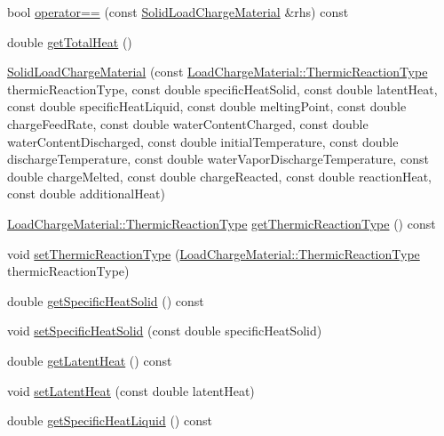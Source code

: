 \begin{DoxyCompactItemize}
\item 
bool \hyperlink{class_solid_load_charge_material_aacf2f41ce38067a52fb7d8456a05a699}{operator==} (const \hyperlink{class_solid_load_charge_material}{Solid\+Load\+Charge\+Material} \&rhs) const
\item 
double \hyperlink{class_solid_load_charge_material_af8593eb758c64236a8a026d6145584f4}{get\+Total\+Heat} ()
\item 
\hyperlink{class_solid_load_charge_material_a9145db5518b94cfc1919b8d6ff809f5e}{Solid\+Load\+Charge\+Material} (const \hyperlink{namespace_load_charge_material_a51d4263e865a5d86236622dd3fe23fd1}{Load\+Charge\+Material\+::\+Thermic\+Reaction\+Type} thermic\+Reaction\+Type, const double specific\+Heat\+Solid, const double latent\+Heat, const double specific\+Heat\+Liquid, const double melting\+Point, const double charge\+Feed\+Rate, const double water\+Content\+Charged, const double water\+Content\+Discharged, const double initial\+Temperature, const double discharge\+Temperature, const double water\+Vapor\+Discharge\+Temperature, const double charge\+Melted, const double charge\+Reacted, const double reaction\+Heat, const double additional\+Heat)
\item 
\hyperlink{namespace_load_charge_material_a51d4263e865a5d86236622dd3fe23fd1}{Load\+Charge\+Material\+::\+Thermic\+Reaction\+Type} \hyperlink{class_solid_load_charge_material_a11708312a99ab985d980e1e521e0864c}{get\+Thermic\+Reaction\+Type} () const
\item 
void \hyperlink{class_solid_load_charge_material_ae2f85e0fbeff9f72b808bf86e645797f}{set\+Thermic\+Reaction\+Type} (\hyperlink{namespace_load_charge_material_a51d4263e865a5d86236622dd3fe23fd1}{Load\+Charge\+Material\+::\+Thermic\+Reaction\+Type} thermic\+Reaction\+Type)
\item 
double \hyperlink{class_solid_load_charge_material_af84f1f7dd167f67c0c02206339bbfe27}{get\+Specific\+Heat\+Solid} () const
\item 
void \hyperlink{class_solid_load_charge_material_ad9d2e3668a6a14700f4dced4882f98c0}{set\+Specific\+Heat\+Solid} (const double specific\+Heat\+Solid)
\item 
double \hyperlink{class_solid_load_charge_material_add60191bd282a9cefa4bf7a60301711b}{get\+Latent\+Heat} () const
\item 
void \hyperlink{class_solid_load_charge_material_ac7361119ab7cc352dfbdc6fcb9175981}{set\+Latent\+Heat} (const double latent\+Heat)
\item 
double \hyperlink{class_solid_load_charge_material_a8b02308194b603276df3a894c401e923}{get\+Specific\+Heat\+Liquid} () const

\end{DoxyCompactItemize}
